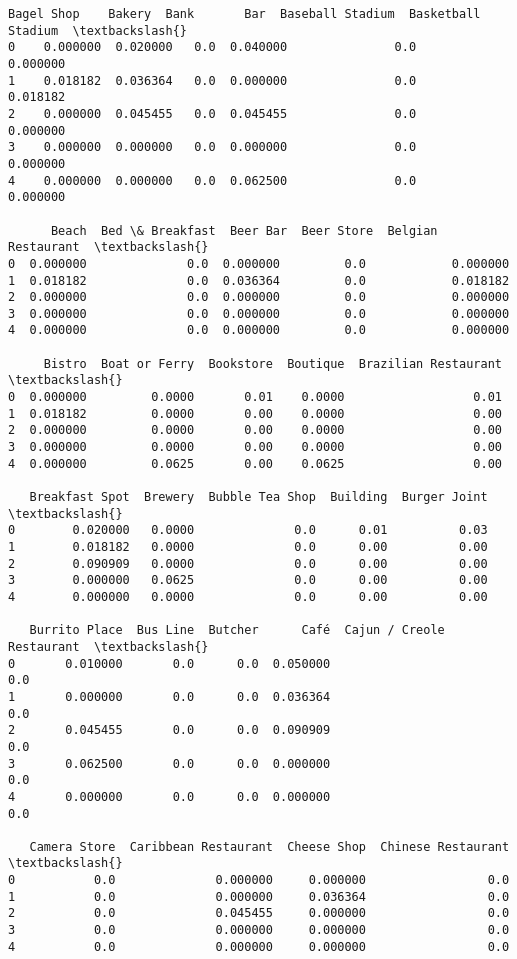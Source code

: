 \documentclass[11pt]{article}
\begin{document}
\begin{tcolorbox}[breakable, size=fbox, boxrule=.5pt, pad at break*=1mm, opacityfill=0]
\begin{Verbatim}[commandchars=\\\{\}]
   Bagel Shop    Bakery  Bank       Bar  Baseball Stadium  Basketball Stadium  \textbackslash{}
0    0.000000  0.020000   0.0  0.040000               0.0            0.000000
1    0.018182  0.036364   0.0  0.000000               0.0            0.018182
2    0.000000  0.045455   0.0  0.045455               0.0            0.000000
3    0.000000  0.000000   0.0  0.000000               0.0            0.000000
4    0.000000  0.000000   0.0  0.062500               0.0            0.000000

      Beach  Bed \& Breakfast  Beer Bar  Beer Store  Belgian Restaurant  \textbackslash{}
0  0.000000              0.0  0.000000         0.0            0.000000
1  0.018182              0.0  0.036364         0.0            0.018182
2  0.000000              0.0  0.000000         0.0            0.000000
3  0.000000              0.0  0.000000         0.0            0.000000
4  0.000000              0.0  0.000000         0.0            0.000000

     Bistro  Boat or Ferry  Bookstore  Boutique  Brazilian Restaurant  \textbackslash{}
0  0.000000         0.0000       0.01    0.0000                  0.01
1  0.018182         0.0000       0.00    0.0000                  0.00
2  0.000000         0.0000       0.00    0.0000                  0.00
3  0.000000         0.0000       0.00    0.0000                  0.00
4  0.000000         0.0625       0.00    0.0625                  0.00

   Breakfast Spot  Brewery  Bubble Tea Shop  Building  Burger Joint  \textbackslash{}
0        0.020000   0.0000              0.0      0.01          0.03
1        0.018182   0.0000              0.0      0.00          0.00
2        0.090909   0.0000              0.0      0.00          0.00
3        0.000000   0.0625              0.0      0.00          0.00
4        0.000000   0.0000              0.0      0.00          0.00

   Burrito Place  Bus Line  Butcher      Café  Cajun / Creole Restaurant  \textbackslash{}
0       0.010000       0.0      0.0  0.050000                        0.0
1       0.000000       0.0      0.0  0.036364                        0.0
2       0.045455       0.0      0.0  0.090909                        0.0
3       0.062500       0.0      0.0  0.000000                        0.0
4       0.000000       0.0      0.0  0.000000                        0.0

   Camera Store  Caribbean Restaurant  Cheese Shop  Chinese Restaurant  \textbackslash{}
0           0.0              0.000000     0.000000                 0.0
1           0.0              0.000000     0.036364                 0.0
2           0.0              0.045455     0.000000                 0.0
3           0.0              0.000000     0.000000                 0.0
4           0.0              0.000000     0.000000                 0.0


\end{Verbatim}
\end{tcolorbox}
\end{document}
